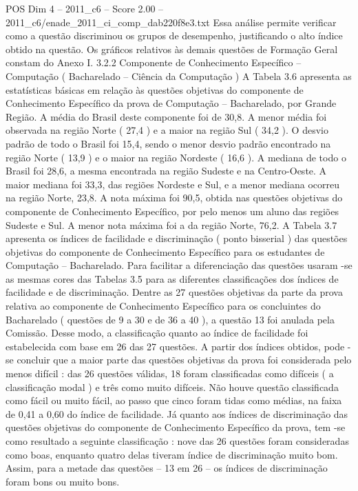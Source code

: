 \begin{textsample}{POS Dim 4 – 2011\_c6 – Score 2.00 – 2011\_c6/enade\_2011\_ci\_comp\_dab220f8e3.txt}
Essa análise permite verificar como a questão discriminou os grupos de desempenho, justificando o alto índice obtido na questão.
Os gráficos relativos às demais questões de Formação Geral constam do Anexo I. 3.2.2 Componente de Conhecimento Específico – Computação ( Bacharelado – Ciência da Computação ) A Tabela 3.6 apresenta as estatísticas básicas em relação às questões objetivas do componente de Conhecimento Específico da prova de Computação – Bacharelado, por Grande Região.
A média do Brasil deste componente foi de 30,8.
A menor média foi observada na região Norte ( 27,4 ) e a maior na região Sul ( 34,2 ).
O desvio padrão de todo o Brasil foi 15,4, sendo o menor desvio padrão encontrado na região Norte ( 13,9 ) e o maior na região Nordeste ( 16,6 ).
A mediana de todo o Brasil foi 28,6, a mesma encontrada na região Sudeste e na Centro-Oeste.
A maior mediana foi 33,3, das regiões Nordeste e Sul, e a menor mediana ocorreu na região Norte, 23,8.
A nota máxima foi 90,5, obtida nas questões objetivas do componente de Conhecimento Específico, por pelo menos um aluno das regiões Sudeste e Sul.
A menor nota máxima foi a da região Norte, 76,2.
A Tabela 3.7 apresenta os índices de facilidade e discriminação ( ponto bisserial ) das questões objetivas do componente de Conhecimento Específico para os estudantes de Computação – Bacharelado.
Para facilitar a diferenciação das questões usaram -se as mesmas cores das Tabelas 3.5 para as diferentes classificações dos índices de facilidade e de discriminação.
Dentre as 27 questões objetivas da parte da prova relativa ao componente de Conhecimento Específico para os concluintes do Bacharelado ( questões de 9 a 30 e de 36 a 40 ), a questão 13 foi anulada pela Comissão.
Desse modo, a classificação quanto ao índice de facilidade foi estabelecida com base em 26 das 27 questões.
A partir dos índices obtidos, pode -se concluir que a maior parte das questões objetivas da prova foi considerada pelo menos difícil : das 26 questões válidas, 18 foram classificadas como difíceis ( a classificação modal ) e três como muito difíceis.
Não houve questão classificada como fácil ou muito fácil, ao passo que cinco foram tidas como médias, na faixa de 0,41 a 0,60 do índice de facilidade.
Já quanto aos índices de discriminação das questões objetivas do componente de Conhecimento Específico da prova, tem -se como resultado a seguinte classificação : nove das 26 questões foram consideradas como boas, enquanto quatro delas tiveram índice de discriminação muito bom.
Assim, para a metade das questões – 13 em 26 – os índices de discriminação foram bons ou muito bons.

\end{textsample}
